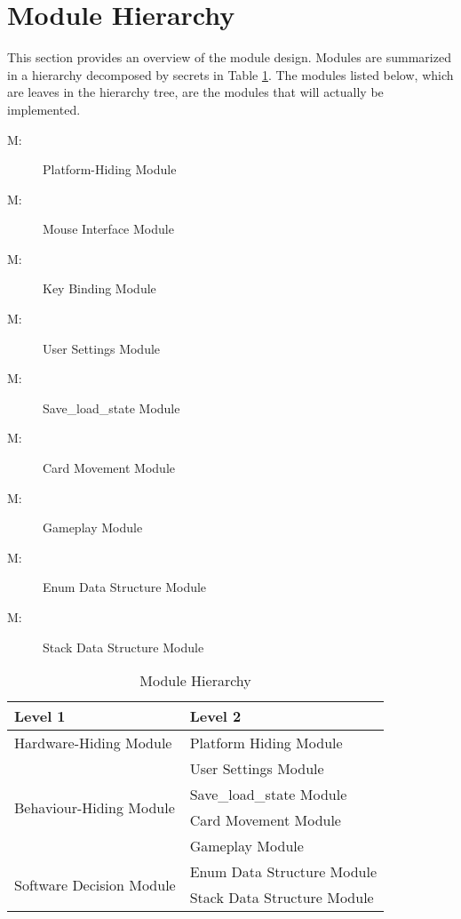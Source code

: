 \documentclass[12pt, titlepage]{article}
\newcounter{mnum}
\newcommand{\mthemnum}{M\themnum}
\begin{document}
	\section{Module Hierarchy} \label{SecMH}
	This section provides an overview of the module design. Modules are 
	summarized in a hierarchy decomposed by secrets in Table \ref{TblMH}. The 
	modules listed below, which are leaves in the hierarchy tree, are the 
	modules that will actually be implemented.
	\begin{description}
		\item [ \mthemnum \label{mPH}:] Platform-Hiding 
		Module
		\item [ \mthemnum \label{mMI}:] Mouse Interface 
		Module
		\item [ \mthemnum \label{mKB}:] Key Binding 
		Module
		\item [ \mthemnum \label{mUS}:] User Settings 
		Module
		\item [ \mthemnum \label{mSL}:] Save\_load\_state 
		Module
		\item [ \mthemnum \label{mCM}:] Card Movement 
		Module
		\item [ \mthemnum \label{mGP}:] Gameplay Module
		\item [ \mthemnum \label{mEnum}:] Enum Data 
		Structure Module
		\item [ \mthemnum \label{mStack}:] Stack Data 
		Structure Module
	\end{description}
	\begin{table}[h!]
		\centering
		\begin{tabular}{p{} p{}}
			\toprule
			\textbf{Level 1} & \textbf{Level 2}\\
			\midrule
			{Hardware-Hiding Module} & Platform Hiding Module \\
			\midrule
			\multirow{4}{0.3\textwidth}{Behaviour-Hiding Module}
			& User Settings Module\\
			& Save\_load\_state Module\\
			& Card Movement Module\\
			& Gameplay Module\\
			\midrule
			\multirow{2}{0.3\textwidth}{Software Decision Module}
			& Enum Data Structure Module\\
			& Stack Data Structure Module\\
			\bottomrule
		\end{tabular}
		\caption{Module Hierarchy}
		\label{TblMH}
	\end{table}
\end{document}
